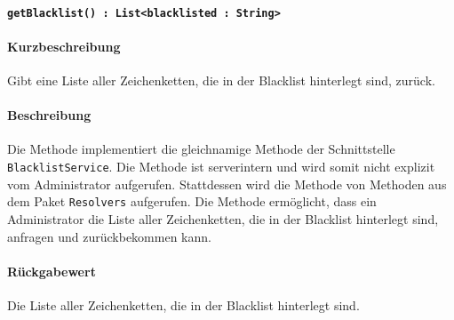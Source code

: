 \paragraph{\texttt{getBlacklist() : List<blacklisted : String>}}%
\paragraph*{Kurzbeschreibung}
Gibt eine Liste aller Zeichenketten, die in der Blacklist hinterlegt sind, zurück.
\paragraph*{Beschreibung}
Die Methode implementiert die gleichnamige Methode der Schnittstelle \texttt{BlacklistService}.
Die Methode ist serverintern und wird somit nicht explizit vom Administrator aufgerufen.
Stattdessen wird die Methode von Methoden aus dem Paket \texttt{Resolvers} aufgerufen.
Die Methode ermöglicht, dass ein Administrator die Liste aller Zeichenketten, die in der Blacklist hinterlegt sind, anfragen und zurückbekommen kann.
\paragraph*{Rückgabewert}
Die Liste aller Zeichenketten, die in der Blacklist hinterlegt sind.
